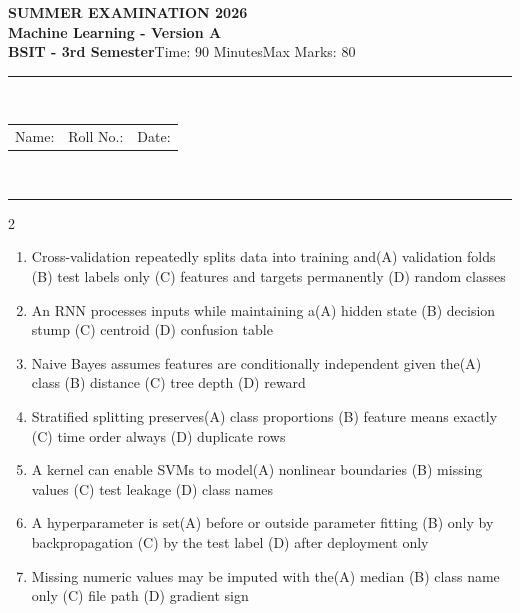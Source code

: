 \documentclass[a4paper]{article}
\makeatletter
\newcommand{\examheader}{%
\begin{center}\textbf{\large SUMMER EXAMINATION 2026}\\[-1pt]
\textbf{\normalsize Machine Learning - Version A}\\[-1pt]
\textbf{BSIT - 3rd Semester}\quad Time: 90 Minutes\quad Max Marks: 80\\[-1pt]
\textcolor{black!65}{\rule{\linewidth}{0.45pt}}\\[-2pt]
\begin{tabularx}{\linewidth}{@{}X X X@{}}Name: \hrulefill & Roll No.: \hrulefill & Date: \hrulefill\end{tabularx}\\[-1pt]
\textcolor{black!65}{\rule{\linewidth}{0.45pt}}\end{center}}
\makeatother
\begin{document}
\examheader
\raggedcolumns
\begin{multicols*}{2}
\fontsize{8.5}{10}\selectfont
\begin{enumerate}
\item Cross-validation repeatedly splits data into training and\newline\hspace*{0.6em}(A) validation folds \quad (B) test labels only \newline\hspace*{0.6em}(C) features and targets permanently \quad (D) random classes
\item An RNN processes inputs while maintaining a\newline\hspace*{0.6em}(A) hidden state \quad (B) decision stump \newline\hspace*{0.6em}(C) centroid \quad (D) confusion table
\item Naive Bayes assumes features are conditionally independent given the\newline\hspace*{0.6em}(A) class \quad (B) distance \newline\hspace*{0.6em}(C) tree depth \quad (D) reward
\item Stratified splitting preserves\newline\hspace*{0.6em}(A) class proportions \quad (B) feature means exactly \newline\hspace*{0.6em}(C) time order always \quad (D) duplicate rows
\item A kernel can enable SVMs to model\newline\hspace*{0.6em}(A) nonlinear boundaries \quad (B) missing values \newline\hspace*{0.6em}(C) test leakage \quad (D) class names
\item A hyperparameter is set\newline\hspace*{0.6em}(A) before or outside parameter fitting \quad (B) only by backpropagation \newline\hspace*{0.6em}(C) by the test label \quad (D) after deployment only
\item Missing numeric values may be imputed with the\newline\hspace*{0.6em}(A) median \quad (B) class name only \newline\hspace*{0.6em}(C) file path \quad (D) gradient sign

\end{enumerate}
\end{multicols*}
\end{document}
